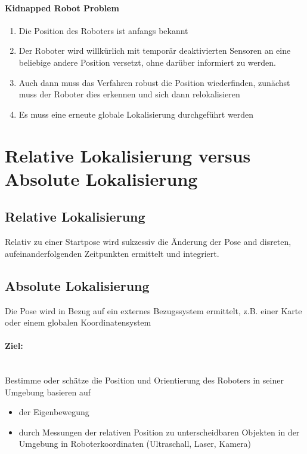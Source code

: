 \paragraph{Kidnapped Robot Problem}
\begin{enumerate}
	\item Die Position des Roboters ist anfangs bekannt
	\item Der Roboter wird willkürlich mit temporär deaktivierten Sensoren an eine beliebige andere Position versetzt, ohne darüber informiert zu werden.
	\item Auch dann muss das Verfahren robust die Position wiederfinden, zunächst muss der Roboter dies erkennen und sich dann relokalisieren
	\item Es muss eine erneute globale Lokalisierung durchgeführt werden
\end{enumerate}

\section{Relative Lokalisierung versus Absolute Lokalisierung}

\subsection*{Relative Lokalisierung}
Relativ zu einer Startpose wird sukzessiv die Änderung der Pose and disreten,
aufeinanderfolgenden Zeitpunkten ermittelt und integriert.

\subsection*{Absolute Lokalisierung}
Die Pose wird in Bezug auf ein externes Bezugssystem ermittelt, z.B. einer
Karte oder einem globalen Koordinatensystem

\paragraph{Ziel:} \hfill \\
Bestimme oder schätze die Position und Orientierung des Roboters in seiner
Umgebung basieren auf
\begin{itemize}
	\item der Eigenbewegung
	\item durch Messungen der relativen Position zu unterscheidbaren Objekten in
		der Umgebung in Roboterkoordinaten (Ultraschall, Laser, Kamera)
\end{itemize}

